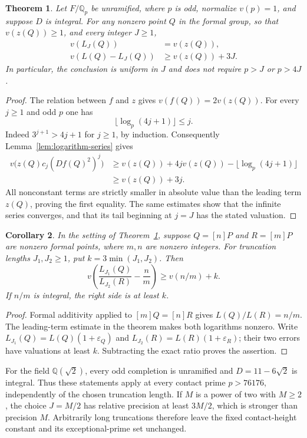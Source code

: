 \documentclass[11pt,a4paper]{article}
\newtheorem{theorem}{Theorem}[section]
\newtheorem{corollary}[theorem]{Corollary}
\theoremstyle{definition}\newtheorem{definition}[theorem]{Definition}
\newcommand{\Q}{\mathbb Q}\newcommand{\Z}{\mathbb Z}
\begin{document}
\begin{theorem}\label{thm:uniform-logarithm-tail}
Let $F/\Q_p$ be unramified, where $p$ is odd, normalize $v(p)=1$,
and suppose $D$ is integral. For any nonzero point $Q$ in the formal
group, so that $v(z(Q))\ge1$, and every integer $J\ge1$,
\[
 \begin{aligned}
 v(L_J(Q))&=v(z(Q)),\\
 v(L(Q)-L_J(Q))&\ge v(z(Q))+3J.
 \end{aligned}
\]
In particular, the conclusion is uniform in $J$ and does not require
$p>J$ or $p>4J$.
\end{theorem}
\begin{proof}
The relation between $f$ and $z$ gives $v(f(Q))=2v(z(Q))$.
For every $j\ge1$ and odd $p$ one has
\[
                 \lfloor\log_p(4j+1)\rfloor\le j.
\]
Indeed $3^{j+1}>4j+1$ for $j\ge1$, by induction. Consequently
Lemma~\ref{lem:logarithm-series} gives
\[
 \begin{split}
 v\bigl(z(Q)c_j(Df(Q)^2)^j\bigr)
 &\ge v(z(Q))+4jv(z(Q))-\lfloor\log_p(4j+1)\rfloor\\
 &\ge v(z(Q))+3j.
 \end{split}
\]
All nonconstant terms are strictly smaller in absolute value than
the leading term $z(Q)$, proving the first equality. The same estimates
show that the infinite series converges, and that its tail beginning
at $j=J$ has the stated valuation.
\end{proof}

\begin{corollary}\label{cor:uniform-logarithm-ratio}
In the setting of Theorem~\ref{thm:uniform-logarithm-tail}, suppose
$Q=[n]P$ and $R=[m]P$ are nonzero formal points, where $m,n$ are
nonzero integers. For truncation lengths $J_1,J_2\ge1$, put
$k=3\min(J_1,J_2)$. Then
\[
 v\left(\frac{L_{J_1}(Q)}{L_{J_2}(R)}-\frac nm\right)
                  \ge v(n/m)+k.
\]
If $n/m$ is integral, the right side is at least $k$.
\end{corollary}
\begin{proof}
Formal additivity applied to $[m]Q=[n]R$ gives $L(Q)/L(R)=n/m$.
The leading-term estimate in the theorem makes both logarithms
nonzero. Write $L_{J_1}(Q)=L(Q)(1+\varepsilon_Q)$ and
$L_{J_2}(R)=L(R)(1+\varepsilon_R)$; their two errors have valuations
at least $k$. Subtracting the exact ratio proves the assertion.
\end{proof}

For the field $\Q(\sqrt2)$, every odd completion is unramified and
$D=11-6\sqrt2$ is integral. Thus these statements apply at every
contact prime $p>76176$, independently of the chosen truncation
length. If $M$ is a power of two with $M\ge2$, the choice $J=M/2$
has relative precision at least $3M/2$, which is stronger than
precision $M$. Arbitrarily long truncations therefore leave the fixed
contact-height constant and its exceptional-prime set unchanged.
\end{document}
